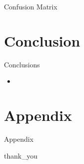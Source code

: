 \begin{frame}{Confusion Matrix}

\end{frame}

\section{Conclusion}

\begin{frame}{Conclusions}
    \begin{itemize}
        \item
    \end{itemize}
\end{frame}

\section{Appendix}

\begin{frame}{Appendix}

\end{frame}

{
{thank_you}
\begin{frame}[plain]
\end{frame}
}


